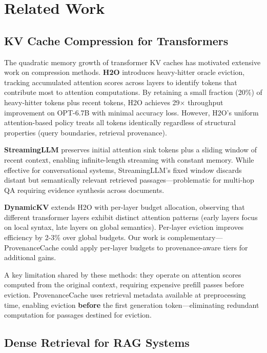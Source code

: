 \section{Related Work}

\subsection{KV Cache Compression for Transformers}

The quadratic memory growth of transformer KV caches has motivated extensive work on compression methods. \textbf{H2O} \cite{zhang2023h2o} introduces heavy-hitter oracle eviction, tracking accumulated attention scores across layers to identify tokens that contribute most to attention computations. By retaining a small fraction (20\%) of heavy-hitter tokens plus recent tokens, H2O achieves 29$\times$ throughput improvement on OPT-6.7B with minimal accuracy loss. However, H2O's uniform attention-based policy treats all tokens identically regardless of structural properties (query boundaries, retrieval provenance).

\textbf{StreamingLLM} \cite{xiao2024streamingllm} preserves initial attention sink tokens plus a sliding window of recent context, enabling infinite-length streaming with constant memory. While effective for conversational systems, StreamingLLM's fixed window discards distant but semantically relevant retrieved passages—problematic for multi-hop QA requiring evidence synthesis across documents.

\textbf{DynamicKV} \cite{liu2024dynamickv} extends H2O with per-layer budget allocation, observing that different transformer layers exhibit distinct attention patterns (early layers focus on local syntax, late layers on global semantics). Per-layer eviction improves efficiency by 2-3\% over global budgets. Our work is complementary—ProvenanceCache could apply per-layer budgets to provenance-aware tiers for additional gains.

A key limitation shared by these methods: they operate on attention scores computed from the original context, requiring expensive prefill passes before eviction. ProvenanceCache uses retrieval metadata available at preprocessing time, enabling eviction \textbf{before} the first generation token—eliminating redundant computation for passages destined for eviction.

\subsection{Dense Retrieval for RAG Systems}

